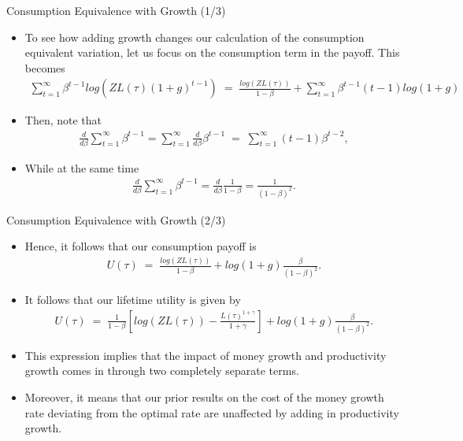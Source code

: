\documentclass[10pt,c,aspectratio=1610,handout]{beamer}
\begin{document}
\begin{frame}{Consumption Equivalence with Growth (1/3)}%
  \begin{itemize}%
    \item[$\blacktriangleright$] To see how adding growth changes our calculation of the consumption equivalent variation, let us focus on the consumption term in the payoff. This becomes%
    \begin{align*}%
      \sum_{t=1}^{\infty} \beta^{t-1} log \left( ZL(\tau)(1+g)^{t-1} \right) \; = \; \frac{log(ZL(\tau))}{1-\beta} + \sum_{t=1}^{\infty} \beta^{t-1}(t-1)log(1+g)%
    \end{align*}%
    \pause%
    \item[$\blacktriangleright$] Then, note that%
    \begin{align*}%
      \frac{d}{d\beta} \sum_{t=1}^{\infty} \beta^{t-1} = \sum_{t=1}^{\infty} \frac{d}{d\beta} \beta^{t-1} \; = \; \sum_{t=1}^{\infty} (t-1) \beta^{t-2},%
    \end{align*}%
    \pause%
    \item[$\blacktriangleright$] While at the same time%
    \begin{align*}%
      \frac{d}{d\beta} \sum_{t=1}^{\infty} \beta^{t-1} = \frac{d}{d\beta} \frac{1}{1-\beta} = \frac{1}{(1-\beta)^2}.%
    \end{align*}%
  \end{itemize}%
\end{frame}%
\begin{frame}{Consumption Equivalence with Growth (2/3)}%
  \begin{itemize}%
    \item[$\blacktriangleright$] Hence, it follows that our consumption payoff is%
    \begin{align*}%
      U(\tau ) \; = \; \frac{log(ZL(\tau))}{1-\beta} + log(1+g) \frac{\beta}{(1-\beta)^2}.%
    \end{align*}%
    \pause%
    \item[$\blacktriangleright$] It follows that our lifetime utility is given by%
    \begin{align*}%
      U(\tau) \; = \; \frac{1}{1-\beta }\left[ log(ZL(\tau )) -\frac{L(\tau )^{1+\gamma }}{1+\gamma }\right] + log(1+g) \frac{\beta}{(1-\beta)^2}.%
    \end{align*}%
    \pause%
    \item[$\blacktriangleright$] This expression implies that the impact of money growth and productivity growth comes in through two completely separate terms.
    \item[$\blacktriangleright$] Moreover, it means that our prior results on the cost of the money growth rate deviating from the optimal rate are unaffected by adding in productivity growth.%
  \end{itemize}%
\end{frame}%
\end{document}
